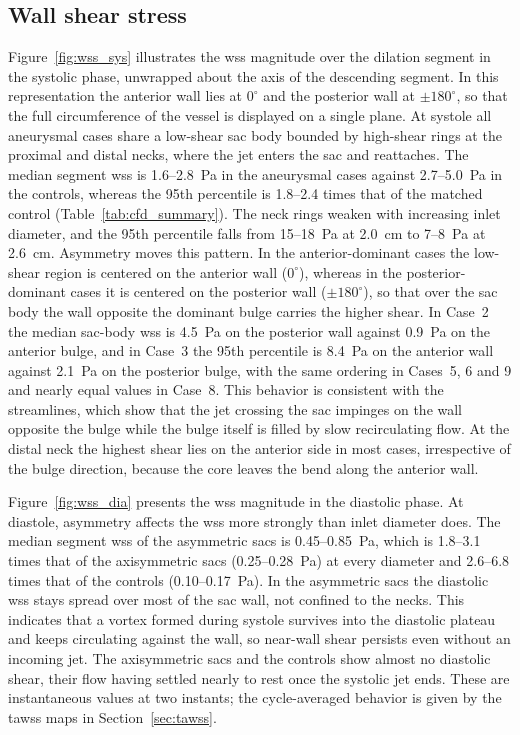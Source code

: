 \documentclass[12pt,a4paper]{article}
\newcommand{\WSS}{\ac{wss}\xspace}
\newcommand{\TAWSS}{\ac{tawss}\xspace}
\theoremstyle{definition}
\numberwithin{equation}{section}
\begin{document}


\subsection{Wall shear stress}
Figure~\ref{fig:wss_sys} illustrates the \WSS magnitude over the dilation segment in the systolic phase, unwrapped about the axis of the descending segment. In this representation the anterior wall lies at \(0^\circ\) and the posterior wall at \(\pm180^\circ\), so that the full circumference of the vessel is displayed on a single plane. At systole all aneurysmal cases share a low-shear sac body bounded by high-shear rings at the proximal and distal necks, where the jet enters the sac and reattaches. The median segment \WSS is 1.6--2.8~Pa in the aneurysmal cases against 2.7--5.0~Pa in the controls, whereas the 95th percentile is 1.8--2.4 times that of the matched control (Table~\ref{tab:cfd_summary}). The neck rings weaken with increasing inlet diameter, and the 95th percentile falls from 15--18~Pa at 2.0~cm to 7--8~Pa at 2.6~cm. Asymmetry moves this pattern. In the anterior-dominant cases the low-shear region is centered on the anterior wall (\(0^\circ\)), whereas in the posterior-dominant cases it is centered on the posterior wall (\(\pm180^\circ\)), so that over the sac body the wall opposite the dominant bulge carries the higher shear. In Case~2 the median sac-body \WSS is 4.5~Pa on the posterior wall against 0.9~Pa on the anterior bulge, and in Case~3 the 95th percentile is 8.4~Pa on the anterior wall against 2.1~Pa on the posterior bulge, with the same ordering in Cases~5, 6 and 9 and nearly equal values in Case~8. This behavior is consistent with the streamlines, which show that the jet crossing the sac impinges on the wall opposite the bulge while the bulge itself is filled by slow recirculating flow. At the distal neck the highest shear lies on the anterior side in most cases, irrespective of the bulge direction, because the core leaves the bend along the anterior wall.

Figure~\ref{fig:wss_dia} presents the \WSS magnitude in the diastolic phase. At
diastole, asymmetry affects the \WSS more strongly than inlet diameter does. The
median segment \WSS of the asymmetric sacs is 0.45--0.85~Pa, which is 1.8--3.1
times that of the axisymmetric sacs (0.25--0.28~Pa) at every diameter and
2.6--6.8 times that of the controls (0.10--0.17~Pa). In the asymmetric sacs the
diastolic \WSS stays spread over most of the sac wall, not confined to the necks.
This indicates that a vortex formed during systole survives into the diastolic
plateau and keeps circulating against the wall, so near-wall shear persists even
without an incoming jet. The axisymmetric sacs and the controls show almost no
diastolic shear, their flow having settled nearly to rest once the systolic jet
ends. These are instantaneous values at two instants; the cycle-averaged behavior
is given by the \TAWSS maps in Section~\ref{sec:tawss}.
\end{document}
